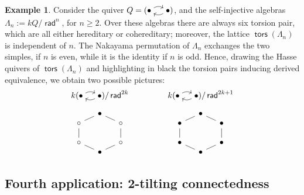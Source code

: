 \documentclass[a4paper,11pt]{amsart}
\theoremstyle{plain}
\theoremstyle{definition}
\newtheorem{ex}[thm]{Example}
\DeclareMathOperator{\rad}{\mathsf{rad}}
\DeclareMathOperator{\tors}{\mathsf{tors}}
\begin{document}
\begin{ex}\label{ex:self-injective-two-vertices}
	Consider the quiver $Q=(\begin{tikzcd}[sep=small,cramped]\bullet\ar[bend
	left]{r}&\ar[bend left]{l}\bullet\end{tikzcd})$, and the self-injective algebras
	$\Lambda_n:=kQ/\rad^n$, for $n\geq 2$. Over these algebras there
	are always six torsion pair, which are all either hereditary or cohereditary; moreover,
	the lattice $\tors(\Lambda_n)$ is independent of $n$. The
	Nakayama permutation of $\Lambda_n$ exchanges the two simples, if $n$ is even,
	while it is the identity if $n$ is odd. Hence, drawing the
	Hasse quivers of $\tors(\Lambda_n)$ and highlighting in black the torsion
	pairs inducing derived equivalence, we obtain two possible pictures:
	\[
		\arraycolsep=2pc
		\begin{array}{cc}
			k(\begin{tikzcd}[sep=small,cramped]\bullet\ar[bend left]{r}&\ar[bend
			left]{l}\bullet\end{tikzcd})/\rad^{2k} &
			k(\begin{tikzcd}[sep=small,cramped]\bullet\ar[bend left]{r}&\ar[bend
			left]{l}\bullet\end{tikzcd})/\rad^{2k+1} \\[10pt]
		\begin{tikzcd}[row sep=0,column sep=1pc]
			& \bullet \ar[-]{dl}\ar[-]{dr} \\
			\circ \ar[-]{dd} & & \circ \ar[-]{dd} \\
			\phantom{\bullet}\\
			\circ \ar[-]{dr} & & \circ \ar[-]{dl} \\
			& \bullet
		\end{tikzcd}
			&
		\begin{tikzcd}[row sep=0,column sep=1pc]
			& \bullet \ar[-]{dl}\ar[-]{dr} \\
			\bullet \ar[-]{dd} & & \bullet \ar[-]{dd} \\
			\phantom{\bullet}\\
			\bullet \ar[-]{dr} & & \bullet \ar[-]{dl} \\
			& \bullet
		\end{tikzcd}
		\end{array}
	\]
\end{ex}

\subsection{Fourth application: 2-tilting connectedness}
\label{subsec:2tilting}
\end{document}
